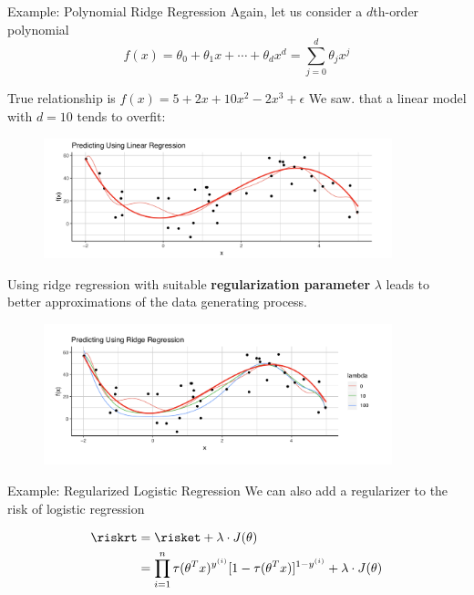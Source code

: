 \begin{vbframe}{Example: Polynomial Ridge Regression}
Again, let us consider a \(d\)th-order polynomial
\[ f(x) = \theta_0 + \theta_1 x + \cdots + \theta_d x^d = \sum_{j = 0}^{d} \theta_j x^j\text{} \]

True relationship is \(f(x) = 5 + 2x +10x^2 - 2x^3 + \epsilon\)
We saw. that a linear model  with \(d = 10\) tends to overfit:

\begin{figure}
\center
\includegraphics[width=0.9\textwidth]{plots/ex_linearRegression.png}\\
\end{figure}

\framebreak

Using ridge regression with suitable \textbf{regularization parameter}  $\lambda$ leads to better approximations of the data generating process.

\vfill

\begin{figure}
\center
\includegraphics[width=0.9\textwidth]{plots/ex_ridgeRegression.png}\\
\end{figure}
\end{vbframe}


\begin{frame}{Example: Regularized Logistic Regression}
We can also add a regularizer to the risk of logistic regression

\begin{align*}
\riskrt &= \risket + \lambda \cdot J(\theta) \\
&= 
\prod_{i=1}^n  \tau(\theta^T x)^{y^{(i)}} [1 -  \tau(\theta^T x)]^{1 - y^{(i)}}
+ \lambda \cdot J(\theta)
\end{align*}
\end{frame}


